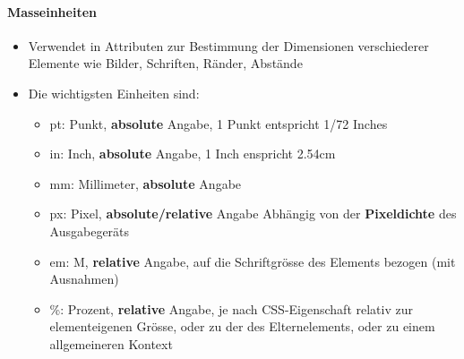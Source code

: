 \paragraph{Masseinheiten}
\begin{itemize}[noitemsep,topsep=0pt,leftmargin=*]
    \item Verwendet in Attributen zur Bestimmung der Dimensionen verschiederer Elemente wie Bilder, Schriften, Ränder, Abstände
    \item Die wichtigsten Einheiten sind:
    \begin{itemize}[noitemsep,topsep=0pt,leftmargin=*]
        \item pt: Punkt, \textbf{absolute} Angabe, 1 Punkt entspricht 1/72 Inches
        \item in: Inch, \textbf{absolute} Angabe, 1 Inch enspricht 2.54cm
        \item mm: Millimeter, \textbf{absolute} Angabe
        \item px: Pixel, \textbf{absolute/relative} Angabe Abhängig von der \textbf{Pixeldichte} des Ausgabegeräts
        \item em: M, \textbf{relative} Angabe, auf die Schriftgrösse des Elements bezogen (mit Ausnahmen)
        \item \%: Prozent, \textbf{relative} Angabe, je nach CSS-Eigenschaft relativ zur elementeigenen Grösse, oder zu der des Elternelements, oder zu einem allgemeineren Kontext
    \end{itemize}
\end{itemize}

